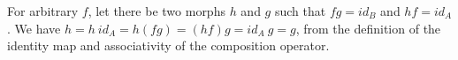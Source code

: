 \tikzset{
  ->,  %
  node distance=4cm, %
}
\quad
\begin{center}\end{center}
For arbitrary $f$, let there be two morphs $h$ and $g$ such that $f g = id_B$ and $h f = id_A$. We have $h = h ~ id_A = h (f g) = (h f) g = id_A ~ g = g$, from the definition of the identity map and associativity of the composition operator.
